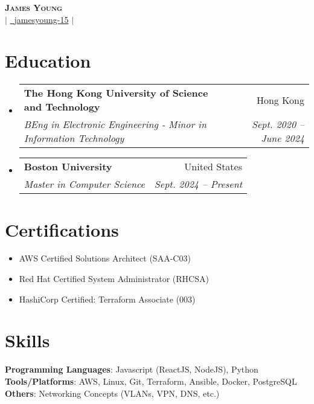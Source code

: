 \documentclass[letterpaper,12pt]{article}
\makeatletter
\newcommand{\resumeSubheading}[4]{
  \vspace{-2pt}\item
    \begin{tabular*}{0.97\textwidth}[t]{l@{\extracolsep{\fill}}r}
      \textbf{#1} & #2 \\
      \textit{\small#3} & \textit{\small #4} \\
    \end{tabular*}\vspace{-7pt}
}
\newcommand{\resumeSubHeadingListStart}{\begin{itemize}[leftmargin=0.05in, label={}]}
\newcommand{\resumeSubHeadingListEnd}{\end{itemize}}
\makeatother
\begin{document}
\begin{center}
    \textbf{\Huge \scshape James Young} \\ \vspace{3pt}
    \href{mailto:jyyoung@bu.edu}{} $|$ 
    \href{https://github.com/jamesyoung-15} {\faGithub\ {jamesyoung-15}} $|$
    \href{https://linkedin.com/in/jamesyyoung}{}
\end{center}


\section{Education}
  \resumeSubHeadingListStart
    \resumeSubheading
      {The Hong Kong University of Science and Technology}{Hong Kong}
      {BEng in Electronic Engineering - Minor in Information Technology}{Sept. 2020 -- June 2024}
  \resumeSubHeadingListEnd
  \resumeSubHeadingListStart
    \resumeSubheading
      {Boston University}{United States}
      {Master in Computer Science}{Sept. 2024 -- Present}
  \resumeSubHeadingListEnd

\section{Certifications}
\vspace{2pt}
        
        \begin{itemize}[itemsep=-1pt, parsep=3pt]
        \small
            \item AWS Certified Solutions Architect (SAA-C03)
            \item Red Hat Certified System Administrator (RHCSA)
            \item HashiCorp Certified: Terraform Associate (003)
        \end{itemize}

\section{Skills}
 \begin{itemize}[leftmargin=0.15in, label={}]
    \small{\item{
     \textbf{Programming Languages}{: Javascript (ReactJS, NodeJS), Python} \\
     \textbf{Tools/Platforms}{: AWS, Linux, Git, Terraform, Ansible, Docker, PostgreSQL} \\ 
     \textbf{Others}{: Networking Concepts (VLANs, VPN, DNS, etc.)} \\
    }}
 \end{itemize}
\end{document}
